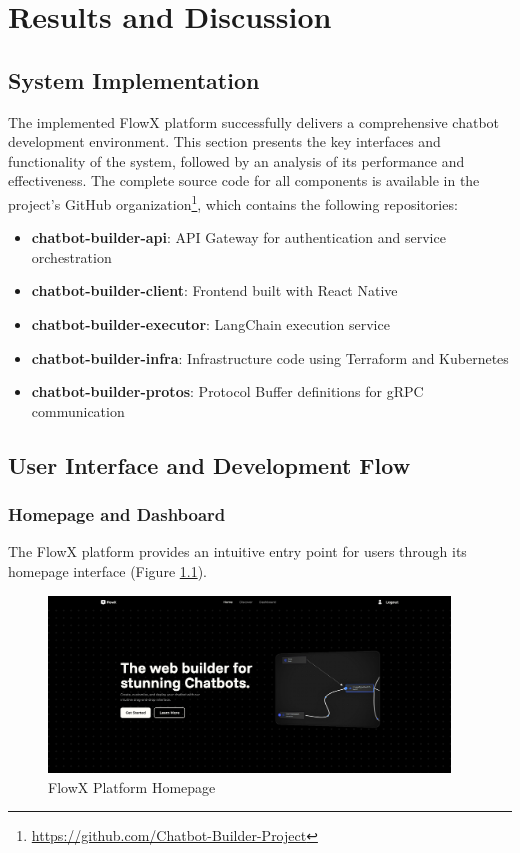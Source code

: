 \chapter{Results and Discussion}

\section{System Implementation}
The implemented FlowX platform successfully delivers a comprehensive chatbot development environment. This section presents the key interfaces and functionality of the system, followed by an analysis of its performance and effectiveness. The complete source code for all components is available in the project's GitHub organization\footnote{\url{https://github.com/Chatbot-Builder-Project}}, which contains the following repositories:

\begin{itemize}
    \item \textbf{chatbot-builder-api}: API Gateway for authentication and service orchestration
    \item \textbf{chatbot-builder-client}: Frontend built with React Native
    \item \textbf{chatbot-builder-executor}: LangChain execution service
    \item \textbf{chatbot-builder-infra}: Infrastructure code using Terraform and Kubernetes
    \item \textbf{chatbot-builder-protos}: Protocol Buffer definitions for gRPC communication
\end{itemize}

\section{User Interface and Development Flow}

\subsection{Homepage and Dashboard}
The FlowX platform provides an intuitive entry point for users through its homepage interface (Figure \ref{fig:homepage}).

\begin{figure}[H]
    \centering
    \includegraphics[width=0.95\textwidth]{assets/screenshots/homepage.png}
    \caption{FlowX Platform Homepage}
    \label{fig:homepage}
\end{figure}


